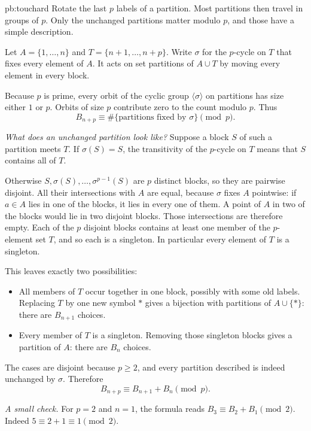 \begin{solution}{pb:touchard}
\idea Rotate the last $p$ labels of a partition. Most partitions then travel in groups of $p$. Only the unchanged partitions matter modulo $p$, and those have a simple description.

\writeup Let $A=\{1,\ldots,n\}$ and $T=\{n+1,\ldots,n+p\}$. Write $\sigma$ for the $p$-cycle on $T$ that fixes every element of $A$. It acts on set partitions of $A\cup T$ by moving every element in every block.

Because $p$ is prime, every orbit of the cyclic group $\langle\sigma\rangle$ on partitions has size either $1$ or $p$. Orbits of size $p$ contribute zero to the count modulo $p$. Thus
\[
B_{n+p}\equiv
\#\{\text{partitions fixed by }\sigma\}\pmod p.
\]

\emph{What does an unchanged partition look like?}
Suppose a block $S$ of such a partition meets $T$. If $\sigma(S)=S$, the transitivity of the $p$-cycle on $T$ means that $S$ contains all of $T$.

Otherwise $S,\sigma(S),\ldots,\sigma^{p-1}(S)$ are $p$ distinct blocks, so they are pairwise disjoint. All their intersections with $A$ are equal, because $\sigma$ fixes $A$ pointwise: if $a\in A$ lies in one of the blocks, it lies in every one of them. A point of $A$ in two of the blocks would lie in two disjoint blocks. Those intersections are therefore empty. Each of the $p$ disjoint blocks contains at least one member of the $p$-element set $T$, and so each is a singleton. In particular every element of $T$ is a singleton.

This leaves exactly two possibilities:
\begin{itemize}
\item All members of $T$ occur together in one block, possibly with some old labels. Replacing $T$ by one new symbol $\ast$ gives a bijection with partitions of $A\cup\{\ast\}$: there are $B_{n+1}$ choices.
\item Every member of $T$ is a singleton. Removing those singleton blocks gives a partition of $A$: there are $B_n$ choices.
\end{itemize}
The cases are disjoint because $p\ge2$, and every partition described is indeed unchanged by $\sigma$. Therefore
\[
\boxed{B_{n+p}\equiv B_{n+1}+B_n\pmod p.}
\]

\emph{A small check.} For $p=2$ and $n=1$, the formula reads
$B_3\equiv B_2+B_1\pmod2$. Indeed $5\equiv2+1\equiv1\pmod2$.


\end{solution}
